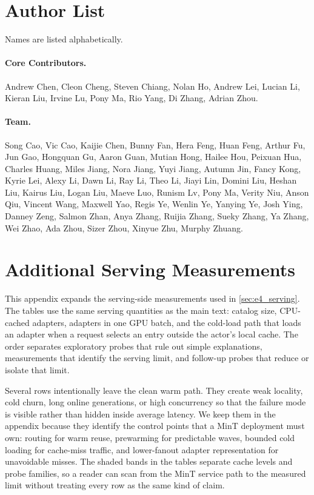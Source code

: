 \documentclass{llmxive}
\begin{document}
\begin{appendices}
\section{Author List}
\label{app:author_list}

Names are listed alphabetically.

\paragraph{Core Contributors.}
\begin{sloppypar}
Andrew Chen, Cleon Cheng, Steven Chiang, Nolan Ho, Andrew Lei, Lucian Li, Kieran Liu, Irvine Lu, Pony Ma, Rio Yang, Di Zhang, Adrian Zhou.
\end{sloppypar}

\paragraph{Team.}
\begin{sloppypar}
Song Cao, Vic Cao, Kaijie Chen, Bunny Fan, Hera Feng, Huan Feng, Arthur Fu, Jun Gao, Hongquan Gu, Aaron Guan, Mutian Hong, Hailee Hou, Peixuan Hua, Charles Huang, Miles Jiang, Nora Jiang, Yuyi Jiang, Autumn Jin, Fancy Kong, Kyrie Lei, Alexy Li, Dawn Li, Ray Li, Theo Li, Jiayi Lin, Domini Liu, Heshan Liu, Kairus Liu, Logan Liu, Maeve Luo, Runism Lv, Pony Ma, Verity Niu, Anson Qiu, Vincent Wang, Maxwell Yao, Regis Ye, Wenlin Ye, Yanying Ye, Josh Ying, Danney Zeng, Salmon Zhan, Anya Zhang, Ruijia Zhang, Sueky Zhang, Ya Zhang, Wei Zhao, Ada Zhou, Sizer Zhou, Xinyue Zhu, Murphy Zhuang.
\end{sloppypar}

\section{Additional Serving Measurements}
\label{app:serving}

This appendix expands the serving-side measurements used in \cref{sec:e4_serving}. The tables use the same serving quantities as the main text: catalog size, CPU-cached adapters, adapters in one GPU batch, and the cold-load path that loads an adapter when a request selects an entry outside the actor's local cache. The order separates exploratory probes that rule out simple explanations, measurements that identify the serving limit, and follow-up probes that reduce or isolate that limit.

Several rows intentionally leave the clean warm path. They create weak locality, cold churn, long online generations, or high concurrency so that the failure mode is visible rather than hidden inside average latency. We keep them in the appendix because they identify the control points that a MinT deployment must own: routing for warm reuse, prewarming for predictable waves, bounded cold loading for cache-miss traffic, and lower-fanout adapter representation for unavoidable misses. The shaded bands in the tables separate cache levels and probe families, so a reader can scan from the MinT service path to the measured limit without treating every row as the same kind of claim.


\end{appendices}
\end{document}
